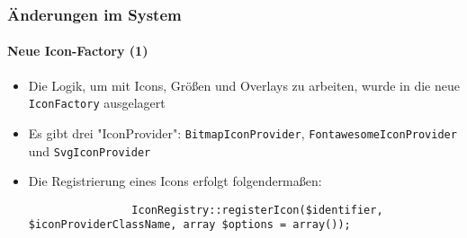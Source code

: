 \begin{frame}[fragile]
	\frametitle{Änderungen im System}
	\framesubtitle{Neue Icon-Factory (1)}

	\lstset{basicstyle=\tiny\ttfamily}

	\begin{itemize}

		\item Die Logik, um mit Icons, Größen und Overlays zu arbeiten, wurde in die neue \texttt{IconFactory} ausgelagert

		\item Es gibt drei "IconProvider": \texttt{BitmapIconProvider}, \texttt{FontawesomeIconProvider}
			und \texttt{SvgIconProvider}

		\item Die Registrierung eines Icons erfolgt folgendermaßen:

			\begin{lstlisting}
				IconRegistry::registerIcon($identifier, $iconProviderClassName, array $options = array());
			\end{lstlisting}

	\end{itemize}

\end{frame}

